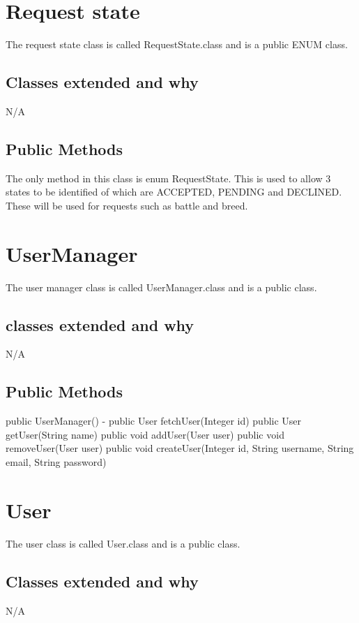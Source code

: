 \documentclass{project}
\begin{document}
\section{Request state}
The request state class is called RequestState.class and is a public ENUM class.
\subsection{Classes extended and why}
N/A
\subsection{Public Methods}
The only method in this class is enum RequestState. This is used to allow 3 states to be identified of which are ACCEPTED, PENDING and DECLINED. These will be used for requests such as battle and breed.

\section{UserManager}
The user manager class is called UserManager.class and is a public class.
\subsection{classes extended and why}
N/A
\subsection{Public Methods}
public UserManager() - 
public User fetchUser(Integer id)
public User getUser(String name)
public void addUser(User user)
public void removeUser(User user)
public void createUser(Integer id, String username, String email, String password)


\section{User}
The user class is called User.class and is a public class.
\subsection{Classes extended and why}
N/A
\end{document}
